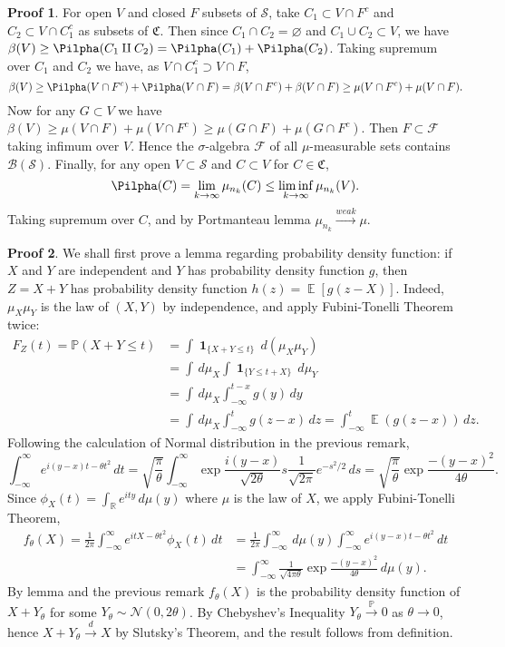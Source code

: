 \documentclass[hidelinks,11pt]{article}
\theoremstyle{definition}
\theoremstyle{dotless}
\newtheorem{prop}{Proof}[section]
\theoremstyle{remark}
\DeclareMathOperator{\E}{\mathbb{E}}
\DeclareMathOperator{\1}{\mathbf{1}}
\begin{document}
\begin{prop}
For open $V$ and closed $F$ subsets of $\mathcal{S}$, take $C_1\subset V\cap F^c$ and $C_2\subset V\cap C_1^c$ as subsets of $\mathfrak{C}$. Then since $C_1\cap C_2=\varnothing$ and $C_1\cup C_2\subset V$, we have $\beta(V)\geq\Pilpha(C_1\amalg C_2)=\Pilpha(C_1)+\Pilpha(C_2)$.
Taking supremum over $C_1$ and $C_2$ we have, as $V\cap C_1^c\supset V\cap F$,
\[\beta(V)\geq\Pilpha(V\cap F^c)+\Pilpha(V\cap F)=\beta(V\cap F^c)+\beta(V\cap F)\geq\mu(V\cap F^c)+\mu(V\cap F).\]\medbreak
Now for any $G\subset V$ we have $\beta(V)\geq\mu(V\cap F)+\mu(V\cap F^c)\geq\mu(G\cap F)+\mu(G\cap F^c)$.
Then $F\subset\mathcal{F}$ taking infimum over $V$. Hence the $\sigma$-algebra $\mathcal{F}$ of all $\mu$-measurable sets contains $\mathcal{B}(\mathcal{S})$.\medbreak
Finally, for any open $V\subset\mathcal{S}$ and $C\subset V$ for $C\in\mathfrak{C}$,
\[\Pilpha(C)=\lim_{k\to\infty}\mu_{n_k}(C)\leq\liminf_{k\to\infty}\mu_{n_k}(V).\]
Taking supremum over $C$, and by Portmanteau lemma $\mu_{n_k}\xrightarrow{weak}\mu$.
\end{prop}

\begin{prop}
We shall first prove a lemma regarding probability density function: if $X$ and $Y$ are independent and $Y$ has probability density function $g$, then $Z=X+Y$ has probability density function $h(z)=\E[g(z-X)]$.\medbreak
Indeed, $\mu_X\mu_Y$ is the law of $(X,Y)$ by independence, and apply Fubini-Tonelli Theorem twice:
\begin{align*}
F_Z(t)=\mathbb{P}(X+Y\leq t)&=\int\1_{\{X+Y\leq t\}}\,d(\mu_X\mu_Y)\\
&=\int\,d\mu_X\int\1_{\{Y\leq t+X\}}\,d\mu_Y\\
&=\int\,d\mu_X\int_{-\infty}^{t-x}g(y)\,dy\\
&=\int\,d\mu_X\int_{-\infty}^tg(z-x)\,dz=\int_{-\infty}^t\E(g(z-x))\,dz.
\end{align*}
Following the calculation of Normal distribution in the previous remark,
\[\int_{-\infty}^\infty e^{i(y-x)t-\theta t^2}\,dt=\sqrt{\frac{\pi}{\theta}}\int_{-\infty}^\infty\exp{\frac{i(y-x)}{\sqrt{2\theta}}s}\frac{1}{\sqrt{2\pi}}e^{-s^2/2}\,ds=\sqrt{\frac{\pi}{\theta}}\exp{\frac{-(y-x)^2}{4\theta}}.\]
Since $\phi_X(t)=\int_\mathbb{R}e^{ity}\,d\mu(y)$ where $\mu$ is the law of $X$, we apply Fubini-Tonelli Theorem,
\begin{align*}
f_\theta(X)=\frac{1}{2\pi}\int_{-\infty}^\infty e^{itX-\theta t^2}\phi_X(t)\,dt&=\frac{1}{2\pi}\int_{-\infty}^\infty\,d\mu(y)\int_{-\infty}^\infty e^{i(y-x)t-\theta t^2}\,dt\\&=\int_{-\infty}^\infty\frac{1}{\sqrt{4\pi\theta}}\exp{\frac{-(y-x)^2}{4\theta}}\,d\mu(y).
\end{align*}
By lemma and the previous remark $f_\theta(X)$ is the probability density function of $X+Y_\theta$ for some $Y_\theta\sim \mathcal{N}(0,2\theta)$. By Chebyshev's Inequality $Y_\theta\xrightarrow{\mathbb{P}}0$ as $\theta\to0$, hence $X+Y_\theta\xrightarrow{d}X$ by Slutsky's Theorem, and the result follows from definition.
\end{prop}
\end{document}
